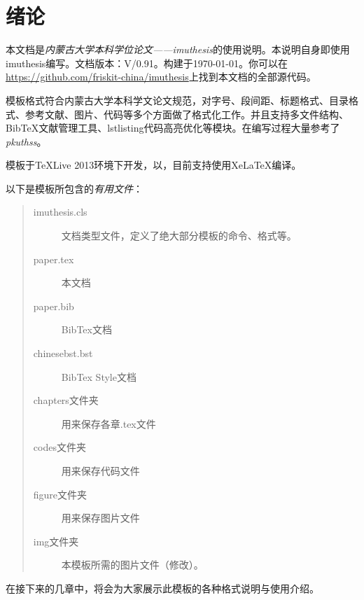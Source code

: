 \chapter{绪论}
    本文档是\emph{内蒙古大学本科学位论文——imuthesis}的使用说明。本说明自身即使用imuthesis编写。文档版本：V/0.91。构建于\today。你可以在\url{https://github.com/friskit-china/imuthesis}上找到本文档的全部源代码。

    模板格式符合内蒙古大学本科学文论文规范，对字号、段间距、标题格式、目录格式、参考文献、图片、代码等多个方面做了格式化工作。并且支持多文件结构、BibTeX文献管理工具、lstlisting代码高亮优化等模块。在编写过程大量参考了\emph{pkuthss}。

    模板于\TeX Live 2013环境下开发，以，目前支持使用XeLaTeX编译。

    以下是模板所包含的\emph{有用文件}：
    \begin{quote}
        \begin{description}
            \item [imuthesis.cls] 文档类型文件，定义了绝大部分模板的命令、格式等。
            \item [paper.tex] 本文档
            \item [paper.bib] BibTex文档
            \item [chinesebst.bst] BibTex Style文档
            \item [chapters文件夹] 用来保存各章.tex文件
            \item [codes文件夹] 用来保存代码文件
            \item [figure文件夹] 用来保存图片文件
            \item [img文件夹] 本模板所需的图片文件（修改）。 
        \end{description}
    \end{quote}
    在接下来的几章中，将会为大家展示此模板的各种格式说明与使用介绍。

